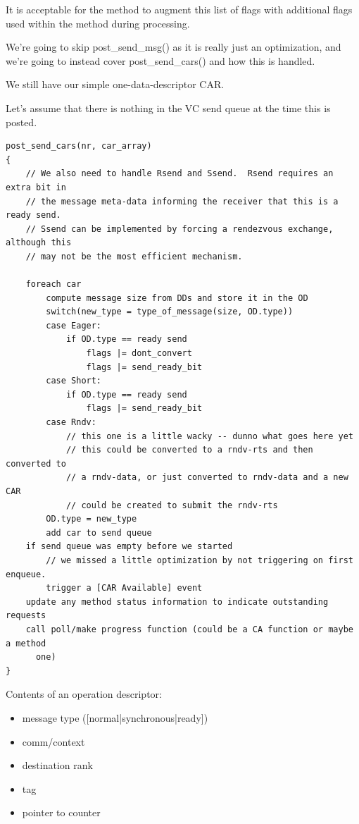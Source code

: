 \documentclass[11pt,letterpaper]{article}
\begin{document}
It is acceptable for the method to augment this list of flags with additional
flags used within the method during processing.

We're going to skip post\_send\_msg() as it is really just an optimization, and
we're going to instead cover post\_send\_cars() and how this is handled.

We still have our simple one-data-descriptor CAR.

Let's assume that there is nothing in the VC send queue at the time this is
posted.

\begin{verbatim}
post_send_cars(nr, car_array)
{
    // We also need to handle Rsend and Ssend.  Rsend requires an extra bit in
    // the message meta-data informing the receiver that this is a ready send.
    // Ssend can be implemented by forcing a rendezvous exchange, although this
    // may not be the most efficient mechanism.

    foreach car
        compute message size from DDs and store it in the OD
        switch(new_type = type_of_message(size, OD.type))
        case Eager:
            if OD.type == ready send
                flags |= dont_convert
                flags |= send_ready_bit
        case Short:
            if OD.type == ready send
                flags |= send_ready_bit
        case Rndv:
            // this one is a little wacky -- dunno what goes here yet
            // this could be converted to a rndv-rts and then converted to
            // a rndv-data, or just converted to rndv-data and a new CAR
            // could be created to submit the rndv-rts
        OD.type = new_type
        add car to send queue
    if send queue was empty before we started
        // we missed a little optimization by not triggering on first enqueue.
        trigger a [CAR Available] event
    update any method status information to indicate outstanding requests
    call poll/make progress function (could be a CA function or maybe a method 
      one)
}
\end{verbatim}

Contents of an operation descriptor:
\begin{itemize}
\item message type ([normal|synchronous|ready])
\item comm/context
\item destination rank
\item tag
\item pointer to counter
\end{itemize}
\end{document}
